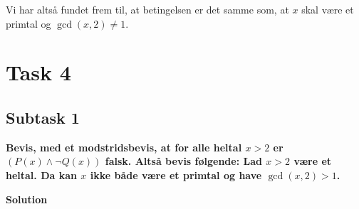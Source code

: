 Vi har altså fundet frem til, at betingelsen er det samme som, at $x$ skal være et primtal og $\gcd(x,2)\neq 1$.

\section{Task 4}
\subsection{Subtask 1}
\noindent
\textbf{Bevis, med et modstridsbevis, at for alle heltal $x>2$ er $(P(x) \wedge \neg Q(x))$ falsk. Altså bevis følgende: Lad $x>2$ være et heltal. Da kan $x$ ikke både være et primtal og have $\gcd(x,2) > 1$. }

\bigskip
\noindent
\textbf{Solution}

